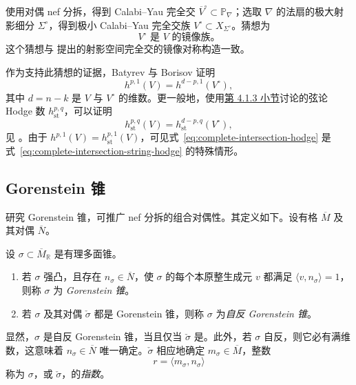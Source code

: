 使用对偶 nef 分拆，得到 Calabi--Yau 完全交 $\overline V^\circ\subset\mathbb P_\nabla$；选取 $\nabla$ 的法扇的极大射影细分 $\Sigma^\circ$，得到极小 Calabi--Yau 完全交族 $V^\circ\subset X_{\Sigma^\circ}$。猜想为
\[
V^\circ\text{ 是 }V\text{ 的镜像族。}
\]
这个猜想与  提出的射影空间完全交的镜像对称构造一致。

作为支持此猜想的证据，Batyrev 与 Borisov 证明
\begin{equation}\label{eq:complete-intersection-hodge}
h^{p,1}(V)=h^{d-p,1}(V^\circ),
\end{equation}
其中 $d=n-k$ 是 $V$ 与 $V^\circ$ 的维数。更一般地，使用\hyperref[subsec:batyrev-hodge]{第 4.1.3 小节}讨论的弦论 Hodge 数 $h_{\mathrm{st}}^{p,q}$，可以证明
\begin{equation}\label{eq:complete-intersection-string-hodge}
h_{\mathrm{st}}^{p,q}(V)=h_{\mathrm{st}}^{d-p,q}(V^\circ),
\end{equation}
见 。由于 $h^{p,1}(V)=h_{\mathrm{st}}^{p,1}(V)$，可见式~\eqref{eq:complete-intersection-hodge} 是式~\eqref{eq:complete-intersection-string-hodge} 的特殊情形。

\subsection{Gorenstein 锥}\label{subsec:gorenstein-cones}

研究 Gorenstein 锥，可推广 nef 分拆的组合对偶性。其定义如下。设有格 $\overline M$ 及其对偶 $\overline N$。
\begin{definition}\label{def:gorenstein-cone}
设 $\sigma\subset\overline M_{\mathbb R}$ 是有理多面锥。
\begin{enumerate}[label=(\roman*)]
\item 若 $\sigma$ 强凸，且存在 $n_\sigma\in\overline N$，使 $\sigma$ 的每个本原整生成元 $v$ 都满足 $\langle v,n_\sigma\rangle=1$，则称 $\sigma$ 为 \emph{Gorenstein 锥}。
\item 若 $\sigma$ 及其对偶 $\check\sigma$ 都是 Gorenstein 锥，则称 $\sigma$ 为\emph{自反 Gorenstein 锥}。
\end{enumerate}
\end{definition}
显然，$\sigma$ 是自反 Gorenstein 锥，当且仅当 $\check\sigma$ 是。此外，若 $\sigma$ 自反，则它必有满维数，这意味着 $n_\sigma\in\overline N$ 唯一确定。$\check\sigma$ 相应地确定 $m_\sigma\in\overline M$，整数
\[
r=\langle m_\sigma,n_\sigma\rangle
\]
称为 $\sigma$，或 $\check\sigma$，的\emph{指数}。

